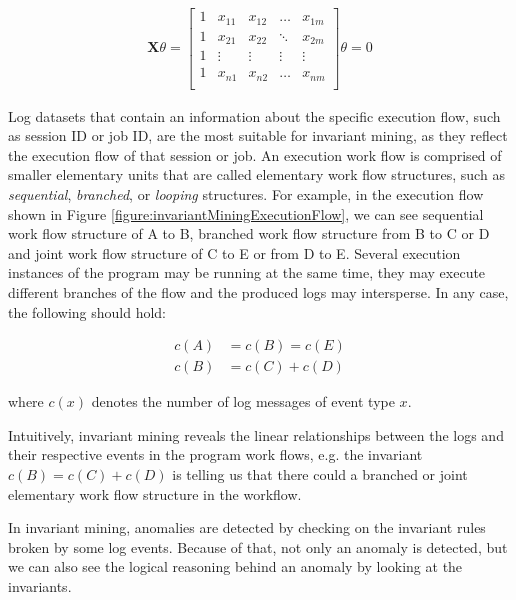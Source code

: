 \begin{gather}
\mathbf{X} \theta = 
\begin{bmatrix}
1 & x_{11} & x_{12} & \hdots & x_{1m}\\
1 & x_{21} & x_{22} & \ddots & x_{2m}\\
1 & \vdots & \vdots & \vdots &\vdots \\
1 & x_{n1} & x_{n2} & \hdots & x_{nm}\\
\end{bmatrix}
\theta = 0
\end{gather}

Log datasets that contain an information about the specific execution flow, such as session ID or job ID, are the most suitable for invariant mining, as they reflect the execution flow of that session or job. An execution work flow is comprised of smaller elementary units that are called elementary work flow structures, such as \textit{sequential}, \textit{branched},  or \textit{looping} structures. For example, in the execution flow shown in Figure \ref{figure:invariantMiningExecutionFlow}, we can see sequential work flow structure of A to B, branched work flow structure from B to C or D and joint work flow structure of C to E or from D to E. Several execution instances of the program may be running at the same time, they may execute different branches of the flow and the produced logs may intersperse. In any case, the following should hold:

\begin{align}
    c(A) &= c(B) = c(E) \\
    c(B) &= c(C) + c(D)
\end{align}

where $c(x)$ denotes the number of log messages of event type $x$. 

Intuitively, invariant mining reveals the linear relationships between the logs and their respective events in the program work flows, e.g. the invariant $c(B) = c(C) + c(D)$ is telling us that there could a branched or joint elementary work flow structure in the workflow. 

In invariant mining, anomalies are detected by checking on the invariant rules broken by some log events. Because of that, not only an anomaly is detected, but we can also see the logical reasoning behind an anomaly by looking at the invariants.  

